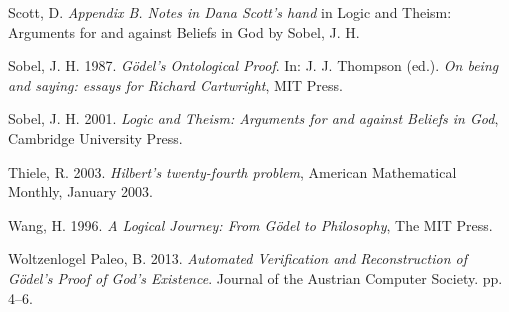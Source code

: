 \documentclass[smallextended]{svjour3}
\begin{document}
\begin{thebibliography}{9}
Scott, D. {\itshape Appendix B. Notes in Dana Scott's hand} in Logic and Theism: Arguments for and against Beliefs in God by Sobel, J. H. 

Sobel, J. H. 1987. {\itshape G\"odel's Ontological Proof}. In: J. J. Thompson (ed.). {\itshape On being and saying: essays for Richard Cartwright},  MIT Press. 

Sobel, J. H. 2001. {\itshape Logic and Theism: Arguments for and against Beliefs in God}, Cambridge University Press. 

 Thiele, R. 2003. {\itshape Hilbert's twenty-fourth problem}, American Mathematical Monthly, January 2003. 

Wang, H. 1996. {\itshape A Logical Journey: From G\"odel to Philosophy}, The MIT Press. 

 Woltzenlogel Paleo, B. 2013. {\itshape Automated Verification and Reconstruction of G\"odel's Proof of God's Existence}. Journal of the Austrian Computer Society. pp. 4--6.










\end{thebibliography}
\end{document}
